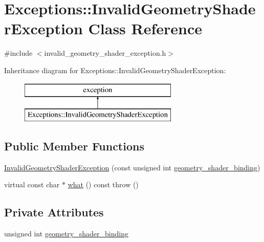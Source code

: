 \hypertarget{class_exceptions_1_1_invalid_geometry_shader_exception}{}\section{Exceptions\+:\+:Invalid\+Geometry\+Shader\+Exception Class Reference}
\label{class_exceptions_1_1_invalid_geometry_shader_exception}


{\ttfamily \#include $<$invalid\+\_\+geometry\+\_\+shader\+\_\+exception.\+h$>$}

Inheritance diagram for Exceptions\+:\+:Invalid\+Geometry\+Shader\+Exception\+:\begin{figure}[H]
\begin{center}
\leavevmode
\includegraphics[height=2.000000cm]{class_exceptions_1_1_invalid_geometry_shader_exception}
\end{center}
\end{figure}
\subsection*{Public Member Functions}
\begin{DoxyCompactItemize}
\item 
\hyperlink{class_exceptions_1_1_invalid_geometry_shader_exception_abd1bf3f98bbb1a590d2d67e36b9d4b75}{Invalid\+Geometry\+Shader\+Exception} (const unsigned int \hyperlink{class_exceptions_1_1_invalid_geometry_shader_exception_a9b392c914b5d558b6ef0eaf130eb7ce9}{geometry\+\_\+shader\+\_\+binding})
\item 
virtual const char $\ast$ \hyperlink{class_exceptions_1_1_invalid_geometry_shader_exception_a9661fdb92878acabb635d02584005e81}{what} () const   throw ()
\end{DoxyCompactItemize}
\subsection*{Private Attributes}
\begin{DoxyCompactItemize}
\item 
unsigned int \hyperlink{class_exceptions_1_1_invalid_geometry_shader_exception_a9b392c914b5d558b6ef0eaf130eb7ce9}{geometry\+\_\+shader\+\_\+binding}
\end{DoxyCompactItemize}


